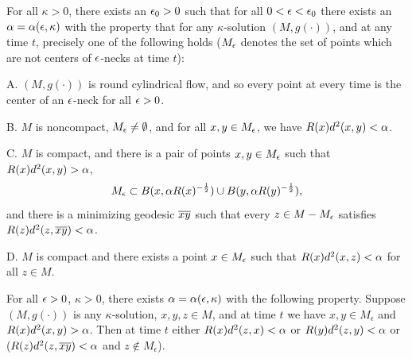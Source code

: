 \begin{corollary}
  \label{cor:kl-necklike-behavior-at-infinity-three-dimensional-solution-strong-version-existence-kappa-solutions}

\label{neckstructure}
For all $\kappa>0$, there exists an $\epsilon_0>0$ such that
for all $0<\epsilon<\epsilon_0$ there exists an $\alpha=\alpha(\epsilon,\kappa)$
with the property that for  any $\kappa$-solution $(M,g(\cdot))$,
and at any time $t$, precisely one of the following holds
($M_\epsilon$ denotes the set of points which are not centers of $\epsilon$-necks
at time $t$):

A.  $(M,g(\cdot))$ is round cylindrical flow, and
so every point at every time is the center of an $\epsilon$-neck for all
$\epsilon>0$.

B.  $M$ is noncompact, $M_\epsilon\neq\emptyset$, and for
all $x,y\in M_\epsilon$, we have $R(x)d^2(x,y)<\alpha$.

C.  $M$ is compact, and there is a pair of points
$x,y\in M_\epsilon$ such that $R(x)d^2(x,y)>\alpha$,
\begin{equation}
M_\epsilon\subset B(x,\alpha R(x)^{-\frac{1}{2}})\cup
B(y,\alpha R(y)^{-\frac{1}{2}}),
\end{equation}
and there is a minimizing geodesic $\overline{xy}$ such that
every $z\in M - M_\epsilon$ satisfies $R(z)d^2(z,\overline{xy})<\alpha$.

D. $M$ is compact and there exists a point $x\in M_\epsilon$
such that $R(x)d^2(x,z)<\alpha$ for all $z\in M$.
\end{corollary}
\begin{lemma}
  \label{lem:kl-necklike-behavior-at-infinity-three-dimensional-solution-strong-version-existence-kappa-solutions}

\label{annoy}
For all $\epsilon>0$, $\kappa>0$,  there exists
$\alpha=\alpha(\epsilon,\kappa)$  with the following
property.  Suppose $(M,g(\cdot))$ is any
$\kappa$-solution, $x,y,z\in M$, and
at time $t$ we have $x, y \in M_\epsilon$
and $R(x)d^2(x,y)>\alpha$.  Then at time $t$ either
$R(x)d^2(z,x)<\alpha$ or $R(y)d^2(z,y)<\alpha$ or ($R(z)d^2(z,\overline{xy})<\alpha$ and
$z \notin M_\epsilon$).
\end{lemma}
